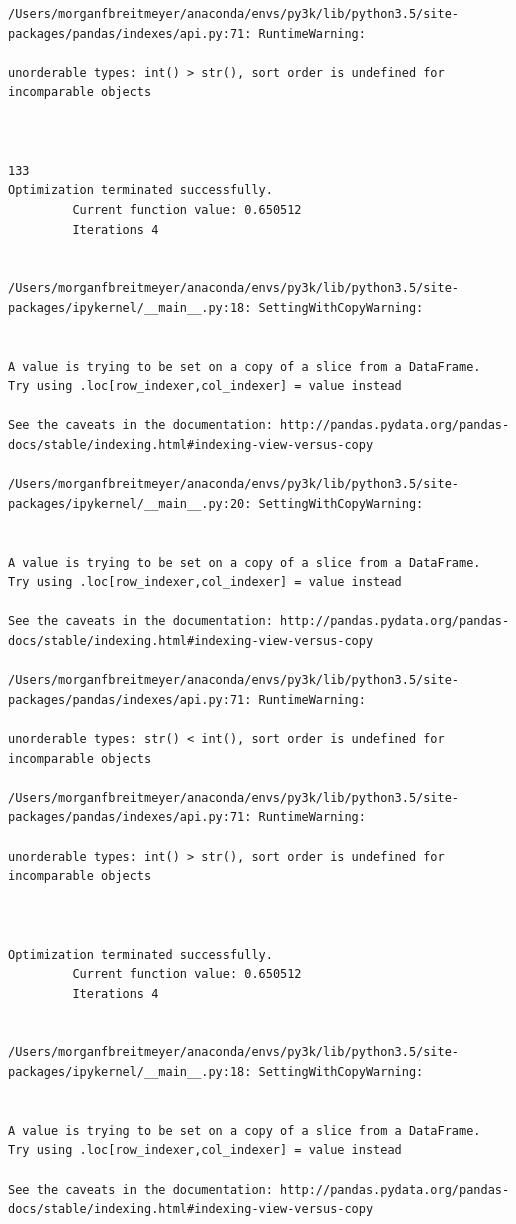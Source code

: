 \begin{lstlisting}
/Users/morganfbreitmeyer/anaconda/envs/py3k/lib/python3.5/site-packages/pandas/indexes/api.py:71: RuntimeWarning:

unorderable types: int() > str(), sort order is undefined for incomparable objects



133
Optimization terminated successfully.
         Current function value: 0.650512
         Iterations 4


/Users/morganfbreitmeyer/anaconda/envs/py3k/lib/python3.5/site-packages/ipykernel/__main__.py:18: SettingWithCopyWarning:


A value is trying to be set on a copy of a slice from a DataFrame.
Try using .loc[row_indexer,col_indexer] = value instead

See the caveats in the documentation: http://pandas.pydata.org/pandas-docs/stable/indexing.html#indexing-view-versus-copy

/Users/morganfbreitmeyer/anaconda/envs/py3k/lib/python3.5/site-packages/ipykernel/__main__.py:20: SettingWithCopyWarning:


A value is trying to be set on a copy of a slice from a DataFrame.
Try using .loc[row_indexer,col_indexer] = value instead

See the caveats in the documentation: http://pandas.pydata.org/pandas-docs/stable/indexing.html#indexing-view-versus-copy

/Users/morganfbreitmeyer/anaconda/envs/py3k/lib/python3.5/site-packages/pandas/indexes/api.py:71: RuntimeWarning:

unorderable types: str() < int(), sort order is undefined for incomparable objects

/Users/morganfbreitmeyer/anaconda/envs/py3k/lib/python3.5/site-packages/pandas/indexes/api.py:71: RuntimeWarning:

unorderable types: int() > str(), sort order is undefined for incomparable objects



Optimization terminated successfully.
         Current function value: 0.650512
         Iterations 4


/Users/morganfbreitmeyer/anaconda/envs/py3k/lib/python3.5/site-packages/ipykernel/__main__.py:18: SettingWithCopyWarning:


A value is trying to be set on a copy of a slice from a DataFrame.
Try using .loc[row_indexer,col_indexer] = value instead

See the caveats in the documentation: http://pandas.pydata.org/pandas-docs/stable/indexing.html#indexing-view-versus-copy


\end{lstlisting}

